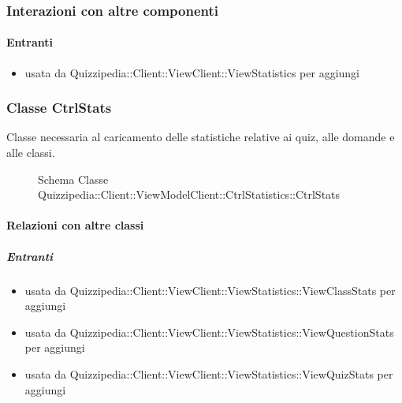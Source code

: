 \subsubsection{Interazioni con altre componenti}
\paragraph{Entranti}
\begin{itemize}
\item usata da Quizzipedia::Client::ViewClient::ViewStatistics per aggiungi
\end{itemize}
\subsubsection{Classe CtrlStats}
Classe necessaria al caricamento delle statistiche relative ai quiz, alle domande e alle classi.
\begin{figure}[H]
\centering
\noindent{}
\caption[Schema Classe CtrlStats]{Schema Classe Quizzipedia::Client::ViewModelClient::CtrlStatistics::CtrlStats}
\end{figure}
\paragraph{Relazioni con altre classi}
\subparagraph{Entranti}
\begin{itemize}
\item usata da Quizzipedia::Client::ViewClient::ViewStatistics::ViewClassStats per aggiungi
\item usata da Quizzipedia::Client::ViewClient::ViewStatistics::ViewQuestionStats per aggiungi
\item usata da Quizzipedia::Client::ViewClient::ViewStatistics::ViewQuizStats per aggiungi
\end{itemize}
